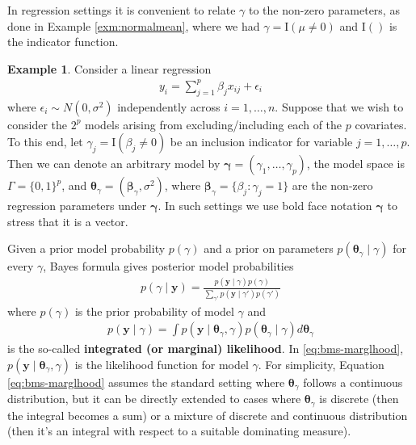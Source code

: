 \documentclass[
]{book}
\newcommand{\bbeta}{\mathbf{\beta}}
\newcommand{\bgamma}{\mathbf{\gamma}}
\newcommand{\btheta}{\mathbf{\theta}}
\newcommand{\by}{\mathbf{y}}
\theoremstyle{definition}
\theoremstyle{definition}
\newtheorem{example}{Example}[chapter]
\theoremstyle{definition}
\theoremstyle{definition}
\theoremstyle{remark}
\begin{document}
In regression settings it is convenient to relate \(\gamma\) to the non-zero parameters, as done in Example \ref{exm:normalmean}, where we had \(\gamma= \mbox{I}(\mu \neq 0)\) and \(\mbox{I}()\) is the indicator function.

\begin{example}
\protect\hypertarget{exm:regression}{}\label{exm:regression}Consider a linear regression
\begin{align*}
y_i = \sum_{j=1}^p \beta_j x_{ij} + \epsilon_i
\end{align*}
where \(\epsilon_i \sim N(0, \sigma^2)\) independently across \(i=1,\ldots,n\).
Suppose that we wish to consider the \(2^p\) models arising from excluding/including each of the \(p\) covariates.
To this end, let \(\gamma_j= \mbox{I}(\beta_j \neq 0)\) be an inclusion indicator for variable \(j=1,\ldots,p\). Then we can denote an arbitrary model by \(\bgamma= (\gamma_1, \ldots,\gamma_p)\), the model space is \(\Gamma= \{0,1\}^p\), and \(\btheta_\gamma= (\bbeta_\gamma, \sigma^2)\), where \(\bbeta_\gamma= \{ \beta_j : \gamma_j = 1 \}\) are the non-zero regression parameters under \(\bgamma\).
In such settings we use bold face notation \(\bgamma\) to stress that it is a vector.
\end{example}

Given a prior model probability \(p(\gamma)\) and a prior on parameters \(p(\btheta_\gamma \mid \gamma)\) for every \(\gamma\), Bayes formula gives posterior model probabilities
\begin{align}
p(\gamma \mid \by)= \frac{p(\by \mid \gamma) p(\gamma)}{\sum_{\gamma'} p(\by \mid \gamma') p(\gamma')}
\label{eq:bms-pp}
\end{align}
where \(p(\gamma)\) is the prior probability of model \(\gamma\) and
\begin{align}
p(\by \mid \gamma)= \int p(\by \mid \btheta_\gamma, \gamma) p(\btheta_\gamma \mid \gamma) d\btheta_\gamma
\label{eq:bms-marglhood}
\end{align}
is the so-called \textbf{integrated (or marginal) likelihood}.
In \eqref{eq:bms-marglhood}, \(p(\by \mid \btheta_\gamma, \gamma)\) is the likelihood function for model \(\gamma\).
For simplicity, Equation \eqref{eq:bms-marglhood} assumes the standard setting where \(\btheta_\gamma\) follows a continuous distribution, but it can be directly extended to cases where \(\btheta_\gamma\) is discrete (then the integral becomes a sum) or a mixture of discrete and continuous distribution (then it's an integral with respect to a suitable dominating measure).
\end{document}
